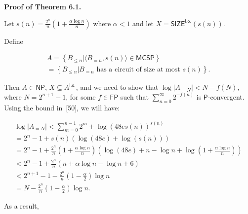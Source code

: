 


\par\medskip\noindent\textbf{Proof of Theorem 6.1.}\par




Let $s(n)=\frac{2^{n}}{n}\left(1+\frac{\alpha\log n}{n}\right)$ where $\alpha<1$ and let $X=\mathsf{SIZE}^{\mathsf{i.o.}}\!\!(s(n))$.\par




Define\par


\[\begin{gathered}
\displaystyle A \displaystyle= \displaystyle\left\{B_{\leq n}\left|\langle B_{=n},s(n)\rangle\in\mathsf{MCSP}\right.\right\} \\
\displaystyle= \displaystyle\left\{B_{\leq n}\left|B_{=n}\text{ has a circuit of size at most }s(n)\right.\right\}.
\end{gathered}\]


Then $A\in\mathsf{NP}$, $X\subseteq A^{\mathsf{i.o.}}$, and we need to show that $\log|A_{=N}|<N-f(N)$, where $N=2^{n+1}-1$, for some $f\in\mathsf{FP}$ such that $\sum_{n=0}^{\infty}2^{-f(n)}$ is $\mathsf{P}$-convergent. Using the bound in [50], we will have:\par


\[\begin{gathered}
\displaystyle\log|A_{=N}| \displaystyle< \displaystyle\sum\limits_{m=0}^{n-1}2^{m}+\log\left(48es\left(n\right)\right)^{s(n)} \\
\displaystyle= \displaystyle 2^{n}-1+s(n)\left(\log(48e)+\log\left(s\left(n\right)\right)\right) \\
\displaystyle= \displaystyle 2^{n}-1+\frac{2^{n}}{n}\left(1+\frac{\alpha\log n}{n}\right)\left(\log\left(48e\right)+n-\log n+\log\left(1+\frac{\alpha\log n}{n}\right)\right) \\
\displaystyle< \displaystyle 2^{n}-1+\frac{2^{n}}{n}\left(n+\alpha\log n-\log n+6\right) \\
\displaystyle< \displaystyle 2^{n+1}-1-\frac{2^{n}}{n}\left(1-\frac{\alpha}{2}\right)\log n \\
\displaystyle= \displaystyle N-\frac{2^{n}}{n}\left(1-\frac{\alpha}{2}\right)\log n.
\end{gathered}\]


As a result,\par


